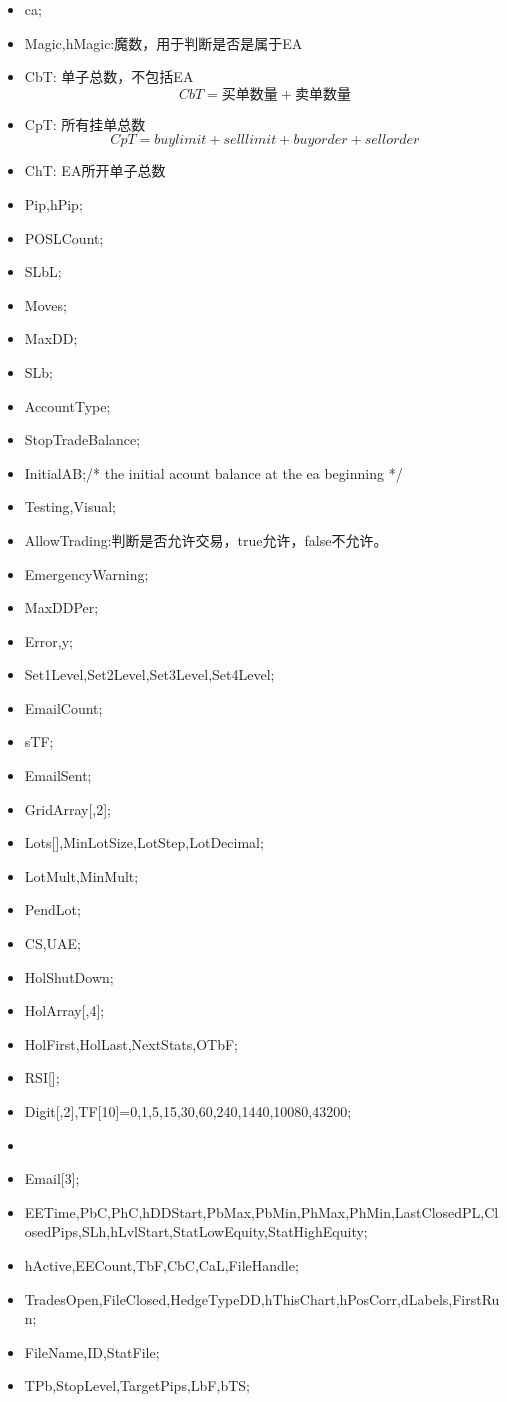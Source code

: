 \begin{itemize}
\item ca;
\item Magic,hMagic:魔数，用于判断是否是属于EA
\item CbT: 单子总数，不包括EA $$CbT = 买单数量+卖单数量 $$
\item CpT: 所有挂单总数$$CpT=buy limit + sell limit + buy order + sell order$$
\item ChT: EA所开单子总数
\item Pip,hPip;
\item POSLCount;
\item SLbL;
\item Moves;
\item MaxDD;
\item SLb;
\item AccountType;
\item StopTradeBalance;
\item InitialAB;/* the initial acount balance at the ea beginning */
\item Testing,Visual;
\item AllowTrading:判断是否允许交易，true允许，false不允许。
\item EmergencyWarning;
\item MaxDDPer;
\item Error,y;
\item Set1Level,Set2Level,Set3Level,Set4Level;
\item EmailCount;
\item sTF;
\item EmailSent;
\item GridArray[,2];
\item Lots[],MinLotSize,LotStep,LotDecimal;
\item LotMult,MinMult;
\item PendLot;
\item CS,UAE;
\item HolShutDown;
\item HolArray[,4];
\item HolFirst,HolLast,NextStats,OTbF;
\item RSI[];
\item Digit[,2],TF[10]={0,1,5,15,30,60,240,1440,10080,43200};
\item 
\item Email[3];
\item EETime,PbC,PhC,hDDStart,PbMax,PbMin,PhMax,PhMin,LastClosedPL,ClosedPips,SLh,hLvlStart,StatLowEquity,StatHighEquity;
\item hActive,EECount,TbF,CbC,CaL,FileHandle;
\item TradesOpen,FileClosed,HedgeTypeDD,hThisChart,hPosCorr,dLabels,FirstRun;
\item FileName,ID,StatFile;
\item TPb,StopLevel,TargetPips,LbF,bTS;

\end{itemize}

